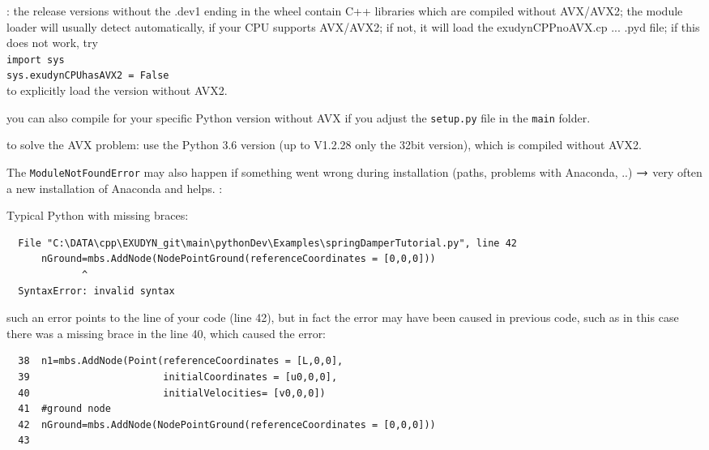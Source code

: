 \item[$\ra$] : the release versions without the .dev1 ending in the wheel contain C++ libraries which are compiled without AVX/AVX2; the module loader will usually detect automatically, if your CPU supports AVX/AVX2; if not, it will load the exudynCPPnoAVX.cp ... .pyd file; if this does not work, try\\
\texttt{import sys}\\
\texttt{sys.exudynCPUhasAVX2 = False}\\
to explicitly load the version without AVX2.
\item[$\ra$] you can also compile for your specific Python version without AVX if you adjust the \texttt{setup.py} file in the \texttt{main} folder.
\item[$\ra$]  to solve the AVX problem: use the Python 3.6 version (up to \codeName V1.2.28 only the 32bit version), which is compiled without AVX2.
\item[$\ra$] The \texttt{ModuleNotFoundError} may also happen if something went wrong during installation (paths, problems with Anaconda, ..) $\ra$ very often a new installation of Anaconda and \codeName helps.
\ei
\ei
\noindent {}:
\bi
  \item Typical Python  with missing braces:
\plainlststyle
\begin{lstlisting}
  File "C:\DATA\cpp\EXUDYN_git\main\pythonDev\Examples\springDamperTutorial.py", line 42
      nGround=mbs.AddNode(NodePointGround(referenceCoordinates = [0,0,0]))
             ^
  SyntaxError: invalid syntax
\end{lstlisting}
\onlyRST{\rstStartNewLine}
%
\item[$\ra$] such an error points to the line of your code (line 42), but in fact the error may have been caused in previous code, such as in this case there was a missing brace in the line 40, which caused the error:
\pythonstyle\begin{lstlisting}
  38  n1=mbs.AddNode(Point(referenceCoordinates = [L,0,0],
  39                       initialCoordinates = [u0,0,0],
  40                       initialVelocities= [v0,0,0])
  41  #ground node
  42  nGround=mbs.AddNode(NodePointGround(referenceCoordinates = [0,0,0]))
  43  
\end{lstlisting}

